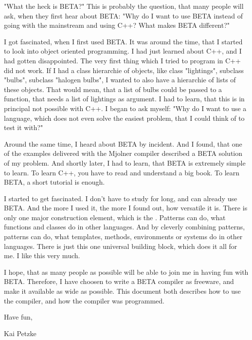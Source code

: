 "What the heck is BETA?"  This is probably the question, that
many people will ask, when they first hear about BETA: "Why do I
want to use BETA instead of going with the mainstream and using
C++?  What makes BETA different?"

I got fascinated, when I first used BETA.  It was around the
time, that I started to look into object oriented
programming.  I had just learned about C++, and I had gotten
disappointed.  The very first thing which I tried to program in
C++ did not work.  If I had a class hierarchie of objects, like
class "lightings", subclass "bulbs", subclass "halogen bulbs", I
wanted to also have a hierarchie of lists of these objects.  That
would mean, that a list of bulbs could be passed to a function,
that needs a list of lightings as argument.  I had to learn, that
this is in principal not possible with C++.  I began to ask
myself: "Why do I want to use a language, which does not even
solve the easiest problem, that I could think of to test it
with?"

Around the same time, I heard about BETA by incident.  And I
found, that one of the examples delivered with the Mjolner
compiler described a BETA solution of my problem.  And shortly
later, I had to learn, that BETA is extremely simple to learn.
To learn C++, you have to read and understand a big book.  To
learn BETA, a short tutorial is enough.

I started to get fascinated.  I don't have to study for long,
and can already use BETA.  And the more I used it, the more
I found out, how versatile it is.  There is only one major
construction element, which is the .  Patterns
can do, what functions and classes do in other languages.
And by cleverly combining patterns, patterns can do, what
templates, methods, environments or systems do in other
languages.  There is just this one universal building block,
which does it all for me.  I like this very much.

I hope, that as many people as possible will be able to join
me in having fun with BETA.  Therefore, I have choosen to
write a BETA compiler as freeware, and make it available as
wide as possible.  This document both describes how to use
the compiler, and how the compiler was programmed.

Have fun,
\vspace{3cm}

Kai Petzke
